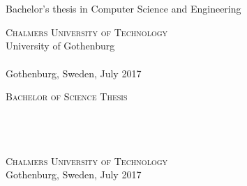 
\begin{titlepage}
			
\addtolength{\voffset}{2cm}


\mbox{}
\vfill
\renewcommand{\familydefault}{\sfdefault} \normalfont %
\textbf{{\Huge{}\varHeadline}} 	\\[0.5cm]
{\Large \varSubtitle}\\[0.5cm] Bachelor's thesis in Computer Science and Engineering \setlength{\parskip}{1cm}

{\Large \varNames} \setlength{\parskip}{2.9cm}

\vspace*{0.5cm}
\textsc{Chalmers University of Technology} \\
University of Gothenburg \\
\varDepartment \\
Gothenburg, Sweden, July 2017

\renewcommand{\familydefault}{\rmdefault} \normalfont %
\end{titlepage}

\newpage
\thispagestyle{empty}
\begin{center}
	\textsc{\large Bachelor of Science Thesis}\\[4cm]		%
	\textbf{\Large \varHeadline} \\[1cm]
	{\large \varSubtitle}\\[1cm]
	{\large \varNames}
	
	\vfill	
	
	\varDepartment \\
	\textsc{Chalmers University of Technology} \\
	Gothenburg, Sweden, July 2017 \\
\end{center}


